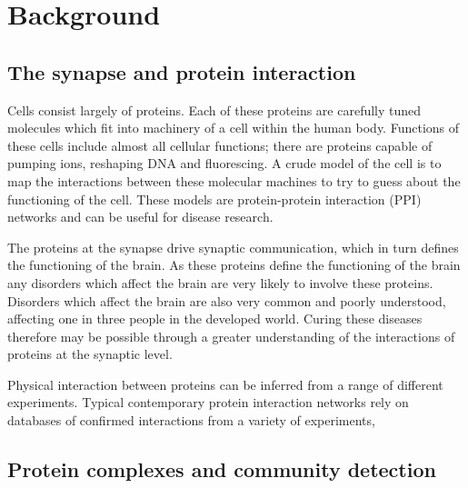 \chapter{Background}
\label{background}

\lipsum[1]


\section{The synapse and protein interaction}

Cells consist largely of proteins.
Each of these proteins are carefully tuned molecules which fit into machinery of a cell within the human body.
Functions of these cells include almost all cellular functions; there are proteins capable of pumping ions, reshaping DNA and fluorescing\cite{alberts_molecular_2008}.
A crude model of the cell is to map the interactions between these molecular machines to try to guess about the functioning of the cell.
These models are protein-protein interaction (PPI) networks and can be useful for disease research.

The proteins at the synapse drive synaptic communication, which in turn defines the functioning of the brain.
As these proteins define the functioning of the brain any disorders which affect the brain are very likely to involve these proteins.
Disorders which affect the brain are also very common and poorly understood, affecting one in three people in the developed world\cite{citation_needed}.
Curing these diseases therefore may be possible through a greater understanding of the interactions of proteins at the synaptic level\cites{synsys,chua_architecture_2010}.


Physical interaction between proteins can be inferred from a range of different experiments.
Typical contemporary protein interaction networks rely on databases of confirmed interactions from a variety of experiments, %


\section{Protein complexes and community detection}

